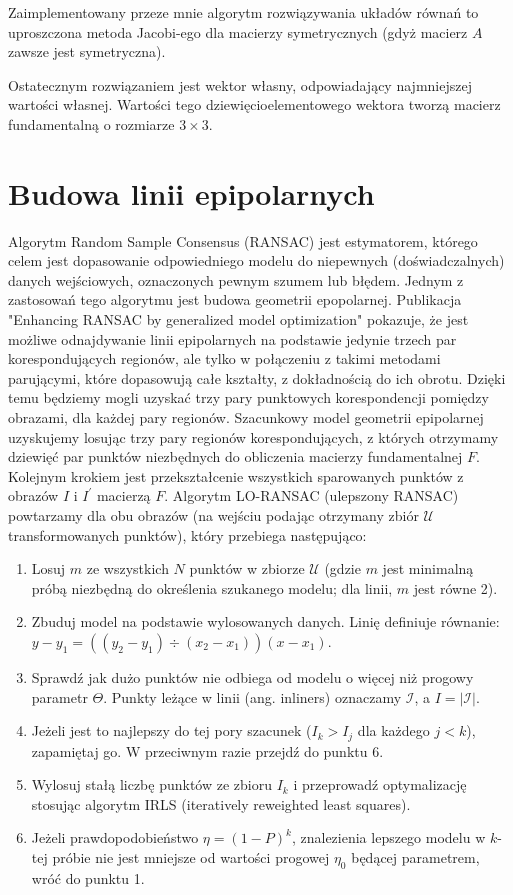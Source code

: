 Zaimplementowany przeze mnie algorytm rozwiązywania układów równań to
uproszczona metoda Jacobi-ego dla macierzy symetrycznych (gdyż macierz $A$
zawsze jest symetryczna).

Ostatecznym rozwiązaniem jest wektor własny, odpowiadający najmniejszej
wartości własnej.  Wartości tego dziewięcioelementowego wektora tworzą macierz
fundamentalną o rozmiarze $3 \times 3$.

\section{Budowa linii epipolarnych}

Algorytm Random Sample Consensus (RANSAC) \cite{ransac} jest estymatorem,
którego celem jest dopasowanie odpowiedniego modelu do niepewnych
(doświadczalnych) danych wejściowych, oznaczonych pewnym szumem lub błędem.
Jednym z zastosowań tego algorytmu jest budowa geometrii epopolarnej.
Publikacja "Enhancing RANSAC by generalized model optimization"
\cite{loransac} pokazuje, że jest możliwe odnajdywanie linii
epipolarnych na podstawie jedynie trzech par korespondujących regionów, ale
tylko w połączeniu z takimi metodami parującymi, które dopasowują całe
kształty, z dokładnością do ich obrotu. Dzięki temu będziemy mogli uzyskać trzy
pary punktowych korespondencji pomiędzy obrazami, dla każdej pary regionów.
Szacunkowy model geometrii epipolarnej uzyskujemy losując trzy pary regionów
korespondujących, z których otrzymamy dziewięć par punktów niezbędnych do
obliczenia macierzy fundamentalnej $F$. Kolejnym krokiem jest przekształcenie
wszystkich sparowanych punktów z obrazów $I$ i $I^\prime$ macierzą $F$.
Algorytm LO-RANSAC \cite{loransac} (ulepszony RANSAC) powtarzamy dla obu
obrazów (na wejściu podając otrzymany zbiór $\mathcal{U}$ transformowanych
punktów), który przebiega następująco: \begin{enumerate} \item Losuj $m$ ze
    wszystkich $N$ punktów w zbiorze $\mathcal{U}$ (gdzie $m$ jest minimalną
    próbą niezbędną do określenia szukanego modelu; dla linii, $m$ jest równe
    2). \item Zbuduj model na podstawie wylosowanych danych. Linię definiuje
    równanie: $y - y_1 = (( y_2 - y_1 )\div( x_2 - x_1 )) (x - x_1)$.  \item
    Sprawdź jak dużo punktów nie odbiega od modelu o więcej niż progowy
    parametr $\Theta$. Punkty leżące w linii (ang. inliners) oznaczamy
    $\mathcal{I}$, a $I = |\mathcal{I}|$.  \item Jeżeli jest to najlepszy do
    tej pory szacunek ($I_k > I_j$ dla każdego $j < k$), zapamiętaj go. W
    przeciwnym razie przejdź do punktu 6. \item Wylosuj stałą liczbę punktów ze
    zbioru $I_k$ i przeprowadź optymalizację stosując algorytm IRLS
    (iteratively reweighted least squares). \item Jeżeli prawdopodobieństwo
    $\eta = (1-P)^k$, znalezienia lepszego modelu w $k$-tej próbie nie jest
    mniejsze od wartości progowej $\eta_0$ będącej parametrem, wróć do punktu
    1.  \end{enumerate}

